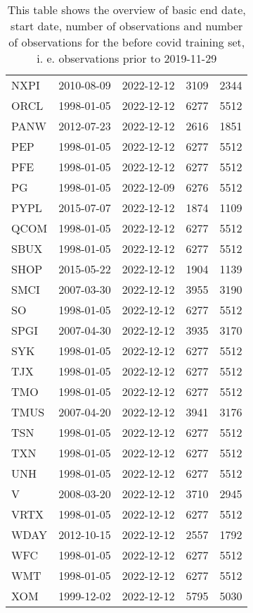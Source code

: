 \begin{table}[ht]
\begin{tabular}{lllrr}
  NXPI & 2010-08-09 & 2022-12-12 & 3109 & 2344 \\ 
  ORCL & 1998-01-05 & 2022-12-12 & 6277 & 5512 \\ 
  PANW & 2012-07-23 & 2022-12-12 & 2616 & 1851 \\ 
  PEP & 1998-01-05 & 2022-12-12 & 6277 & 5512 \\ 
  PFE & 1998-01-05 & 2022-12-12 & 6277 & 5512 \\ 
  PG & 1998-01-05 & 2022-12-09 & 6276 & 5512 \\ 
  PYPL & 2015-07-07 & 2022-12-12 & 1874 & 1109 \\ 
  QCOM & 1998-01-05 & 2022-12-12 & 6277 & 5512 \\ 
  SBUX & 1998-01-05 & 2022-12-12 & 6277 & 5512 \\ 
  SHOP & 2015-05-22 & 2022-12-12 & 1904 & 1139 \\ 
  SMCI & 2007-03-30 & 2022-12-12 & 3955 & 3190 \\ 
  SO & 1998-01-05 & 2022-12-12 & 6277 & 5512 \\ 
  SPGI & 2007-04-30 & 2022-12-12 & 3935 & 3170 \\ 
  SYK & 1998-01-05 & 2022-12-12 & 6277 & 5512 \\ 
  TJX & 1998-01-05 & 2022-12-12 & 6277 & 5512 \\ 
  TMO & 1998-01-05 & 2022-12-12 & 6277 & 5512 \\ 
  TMUS & 2007-04-20 & 2022-12-12 & 3941 & 3176 \\ 
  TSN & 1998-01-05 & 2022-12-12 & 6277 & 5512 \\ 
  TXN & 1998-01-05 & 2022-12-12 & 6277 & 5512 \\ 
  UNH & 1998-01-05 & 2022-12-12 & 6277 & 5512 \\ 
  V & 2008-03-20 & 2022-12-12 & 3710 & 2945 \\ 
  VRTX & 1998-01-05 & 2022-12-12 & 6277 & 5512 \\ 
  WDAY & 2012-10-15 & 2022-12-12 & 2557 & 1792 \\ 
  WFC & 1998-01-05 & 2022-12-12 & 6277 & 5512 \\ 
  WMT & 1998-01-05 & 2022-12-12 & 6277 & 5512 \\ 
  XOM & 1999-12-02 & 2022-12-12 & 5795 & 5030 \\ 
   \hline
\end{tabular}
\caption[Overview]{This table shows the overview of basic end date, start date, number of observations and number of observations 
                     for the before covid training set, i. e. observations prior to 2019-11-29} 
\label{Table:Overview}
\end{table}
